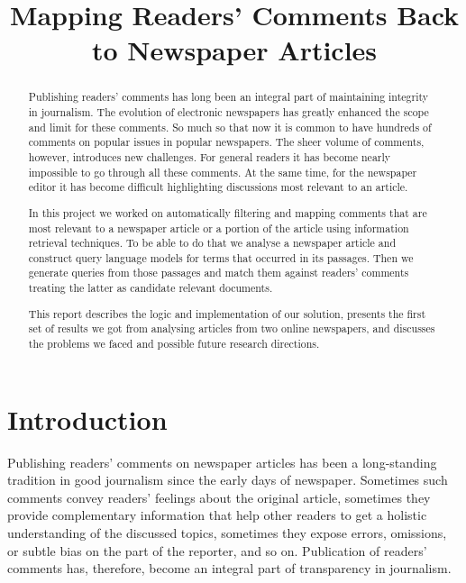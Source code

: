 \documentclass[article]{IEEEtran}
\begin{document}
\title{Mapping Readers' Comments Back to Newspaper Articles}
\author{
        }
\maketitle


\maketitle
\begin{abstract}
Publishing readers' comments has long been an integral part of maintaining integrity in journalism. The evolution of electronic newspapers has greatly enhanced the scope and limit for these comments. So much so that now it is common to have hundreds of comments on popular issues in popular newspapers. The sheer volume of comments, however, introduces new challenges. For general readers it has become nearly impossible to go through all these comments. At the same time, for the newspaper editor it has become difficult highlighting discussions most relevant to an article. 

In this project we worked on automatically filtering and mapping comments that are most relevant to a newspaper article or a portion of the article using information retrieval techniques. To be able to do that we analyse a newspaper article and construct query language models for terms that occurred in its passages. Then we generate queries from those passages and match them against readers' comments treating the latter as candidate relevant documents.

This report describes the logic and implementation of our solution, presents the first set of results we got from analysing articles from two online newspapers, and discusses the problems we faced and possible future research directions.   
\end{abstract}


\section{Introduction}
Publishing readers' comments on newspaper articles has been a long-standing tradition in good journalism since the early days of newspaper. Sometimes such  comments convey readers' feelings about the original article, sometimes they provide complementary information that help other readers to get a holistic understanding of the discussed topics, sometimes they expose errors, omissions, or subtle bias on the part of the reporter, and so on. Publication of readers' comments has, therefore, become an integral part of transparency in journalism.
\end{document}
